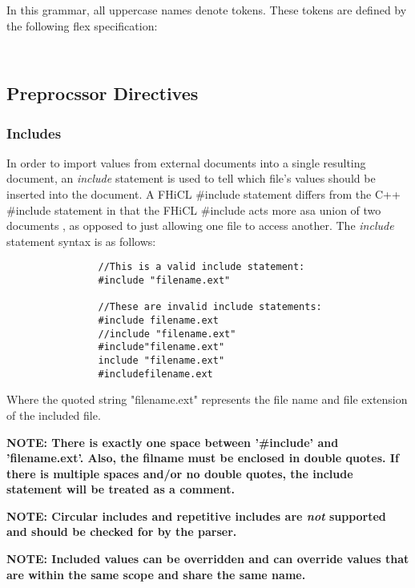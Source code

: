 \documentclass{memarticle}
\begin{document}
	In this grammar,
	all uppercase names denote tokens.
	These tokens are defined by the following flex specification:
	\begin{verbatim}
	
	\end{verbatim}

	\subsection{Preprocssor Directives}
		\subsubsection{Includes}
			In order to import values from external documents into a single resulting document,
			an \emph{include} statement is used to tell which file's values should be inserted into the document.
			A FHiCL \#include statement differs from the C++ \#include statement 
			in that the FHiCL \#include acts 
			more asa union of two documents
			, as opposed to just allowing one file to access another.
			The \emph{include} statement syntax is as follows:
			\begin{verbatim}
				//This is a valid include statement:
				#include "filename.ext"
				
				//These are invalid include statements:
				#include filename.ext
				//include "filename.ext"
				#include"filename.ext"
				include "filename.ext"
				#includefilename.ext
			\end{verbatim}
			\vspace{1mm}
			\par
			Where the quoted string "filename.ext" represents the file name and file extension of the included file.
			\vspace{1mm}
			\par
			\bf NOTE: \rm There is exactly one space between '\#include' and 'filename.ext'.
			Also, the filname must be enclosed in double quotes.
			If there is multiple spaces and/or no double quotes, 
			the include statement will be treated as a comment.
			\par
			\bf NOTE: \rm Circular includes 
			and repetitive includes 
			are \emph{not} supported and should be checked for by the parser.
			\par
			\bf NOTE: \rm Included values can be overridden
				and can override values that are within the same scope
				and share the same name.	
\end{document}
